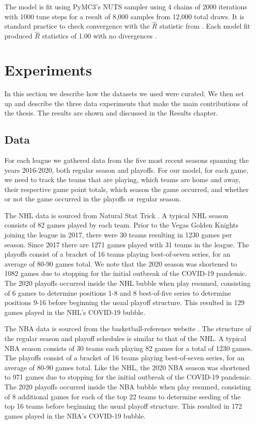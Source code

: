 The model is fit using PyMC3's NUTS sampler using 4 chains of 2000 iterations with 1000 tune steps for a result of 8,000 samples from 12,000 total draws. It is standard practice to check convergence with the \(\hat{R}\) statistic from \cite{Gelman1992} \cite{Brooks1997}.  Each model fit produced \(\hat{R}\) statistics of 1.00 with no divergences \cite{Betancourt2017}.

\section{Experiments}

In this section we describe how the datasets we used were curated. We then set up and describe the three data experiments that make the main contributions of the thesis. The results are shown and discussed in the Results chapter.

\subsection{Data}

For each league we gathered data from the five most recent seasons spanning the years 2016-2020, both regular season and playoffs. For our model, for each game, we need to track the teams that are playing, which teams are home and away, their respective game point totals, which season the game occurred, and whether or not the game occurred in the playoffs or regular season.

The NHL data is sourced from Natural Stat Trick \cite{NS2020}. A typical NHL season consists of 82 games played by each team. Prior to the Vegas Golden Knights joining the league in 2017, there were 30 teams resulting in 1230 games per season. Since 2017 there are 1271 games played with 31 teams in the league. The playoffs consist of a bracket of 16 teams playing best-of-seven series, for an average of 80-90 games total. We note that the 2020 season was shortened to 1082 games due to stopping for the initial outbreak of the COVID-19 pandemic. The 2020 playoffs occurred inside the NHL bubble when play resumed, consisting of 6 games to determine positions 1-8 and 8 best-of-five series to determine positions 9-16 before beginning the usual playoff structure. This resulted in 129 games played in the NHL's COVID-19 bubble.

The NBA data is sourced from the basketball-reference website \cite{BR2020}. The structure of the regular season and playoff schedules is similar to that of the NHL. A typical NBA season consists of 30 teams each playing 82 games for a total of 1230 games. The playoffs consist of a bracket of 16 teams playing best-of-seven series, for an average of 80-90 games total. Like the NHL, the 2020 NBA season was shortened to 971 games due to stopping for the initial outbreak of the COVID-19 pandemic. The 2020 playoffs occurred inside the NBA bubble when play resumed, consisting of 8 additional games for each of the top 22 teams to determine seeding of the top 16 teams before beginning the usual playoff structure. This resulted in 172 games played in the NBA's COVID-19 bubble.

